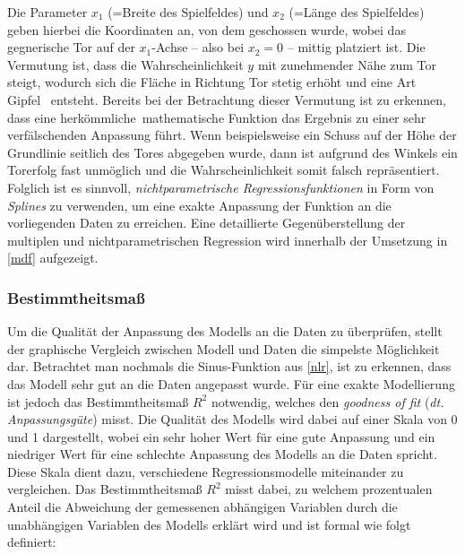 Die Parameter $x_1$ (=Breite des Spielfeldes) und $x_2$ (=Länge des Spielfeldes) geben hierbei die Koordinaten an, von dem geschossen wurde, wobei das gegnerische Tor auf der $x_1$-Achse -- also bei $x_2=0$ -- mittig platziert ist. Die Vermutung ist, dass die Wahrscheinlichkeit $y$ mit zunehmender Nähe zum Tor steigt, wodurch sich die Fläche in Richtung Tor stetig erhöht und eine Art \glqq Gipfel\grqq~ entsteht. Bereits bei der Betrachtung dieser Vermutung ist zu erkennen, dass eine \glqq herkömmliche\grqq~mathematische Funktion das Ergebnis zu einer sehr verfälschenden Anpassung führt. Wenn beispielsweise ein Schuss auf der Höhe der Grundlinie seitlich des Tores abgegeben wurde, dann ist aufgrund des Winkels ein Torerfolg fast unmöglich und die Wahrscheinlichkeit somit falsch repräsentiert. Folglich ist es sinnvoll, \textit{nichtparametrische Regressionsfunktionen} in Form von \textit{Splines} zu verwenden, um eine exakte Anpassung der Funktion an die vorliegenden Daten zu erreichen. Eine detaillierte Gegenüberstellung der multiplen und nichtparametrischen Regression wird innerhalb der Umsetzung in \vref{mdf} aufgezeigt.

\subsubsection{Bestimmtheitsmaß}
\label{bhm}
Um die Qualität der Anpassung des Modells an die Daten zu überprüfen, stellt der graphische Vergleich zwischen Modell und Daten die simpelste Möglichkeit dar. Betrachtet man nochmals die Sinus-Funktion aus \vref{nlr}, ist zu erkennen, dass das Modell sehr gut an die Daten angepasst wurde. Für eine exakte Modellierung ist jedoch das Bestimmtheitsmaß $R^2$ notwendig, welches den \textit{goodness of fit} (\textit{dt. Anpassungsgüte}) misst. Die Qualität des Modells wird dabei auf einer Skala von 0 und 1 dargestellt, wobei ein sehr hoher Wert für eine gute Anpassung und ein niedriger Wert für eine schlechte Anpassung des Modells an die Daten spricht. Diese Skala dient dazu, verschiedene Regressionsmodelle miteinander zu vergleichen. Das Bestimmtheitsmaß $R^2$ misst dabei, zu welchem prozentualen Anteil die Abweichung der gemessenen abhängigen Variablen durch die unabhängigen Variablen des Modells erklärt wird und ist formal wie folgt definiert:


